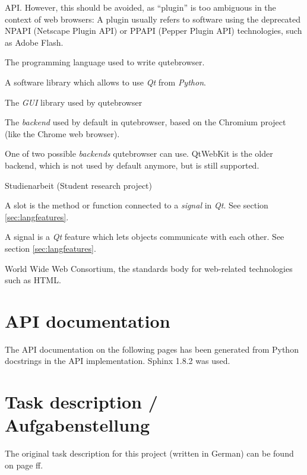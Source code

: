 \begin{appendices}
\begin{multicols}{2}
\begin{description}[leftmargin=0pt]
{      API. However, this should be avoided, as ``plugin'' is too ambiguous in
      the context of web browsers: A plugin usually refers to software using the
      deprecated NPAPI (Netscape Plugin API) or PPAPI (Pepper Plugin API)
      technologies, such as Adobe Flash.}
  \item[Python]{The programming language used to write qutebrowser.}
  \item[PyQt]{A software library which allows to use \emph{Qt} from \emph{Python}.}
  \item[Qt]{The \emph{GUI} library used by qutebrowser}
  \item[QtWebEngine]{The \emph{backend} used by default in qutebrowser, based on
      the Chromium project (like the Chrome web browser).}
  \item[QtWebKit]{One of two possible \emph{backends} qutebrowser can use.
      QtWebKit is the older backend, which is not used by default anymore, but is
      still supported.}
  \item[SA]{Studienarbeit (Student research project)}
  \item[slot] A slot is the method or function connected to a \emph{signal} in
    \emph{Qt}. See section \ref{sec:langfeatures}.
  \item[signal] A signal is a \emph{Qt} feature which lets objects communicate
    with each other. See section \ref{sec:langfeatures}.
  \item[W3C]{World Wide Web Consortium, the standards body for web-related
      technologies such as HTML.}
\end{description}
\end{multicols}

\chapter{API documentation}
\label{ch:sphinx}
The API documentation on the following pages has been generated from Python
docstrings in the API implementation. Sphinx 1.8.2 was used.

{\let\clearpage\relax\chapter{Task description / Aufgabenstellung}}
The original task description for this project (written in German) can be found on page \pageref{ch:aufgabenstellung}ff.


\label{ch:aufgabenstellung}



\end{appendices}
